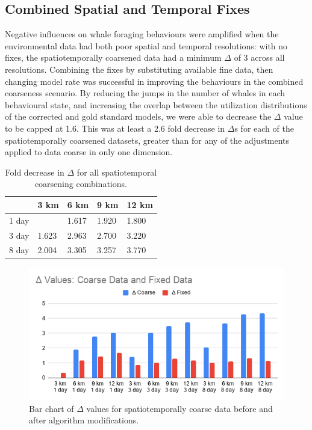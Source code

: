 \documentclass[11pt]{article}
\begin{document}
\subsection{Combined Spatial and Temporal Fixes}
Negative influences on whale foraging behaviours were amplified when the environmental data had both poor spatial and temporal resolutions: with no fixes, the spatiotemporally coarsened data had a minimum $\Delta$ of 3 across all resolutions. Combining the fixes by substituting available fine data, then changing model rate was successful in improving the behaviours in the combined coarseness scenario. By reducing the jumps in the number of whales in each behavioural state, and increasing the overlap between the utilization distributions of the corrected and gold standard models, we were able to decrease the $\Delta$ value to be capped at 1.6. This was at least a 2.6 fold decrease in $\Delta$s for each of the spatiotemporally coarsened datasets, greater than for any of the adjustments applied to data coarse in only one dimension. \par 

\begin{table}[ht]
    \centering
    \begin{tabular}{lllll}
    \toprule
    &3 km&6 km&9 km&12 km\\\hline
    1 day&&	1.617&	1.920	&1.800\\
    3 day&1.623&	2.963	&2.700&	3.220\\
    8 day&2.004&	3.305	&3.257&	3.770\\
    \bottomrule
    \end{tabular}
    \caption{Fold decrease in $\Delta$ for all spatiotemporal coarsening combinations.}
    \label{table:allfolddelta}
\end{table}

\begin{figure}[ht] \centering
    \includegraphics[width=6in]{new_old_delta_bar.png}
    \caption{Bar chart of $\Delta$ values for spatiotemporally coarse data before and after algorithm modifications.}
\end{figure}
\end{document}

